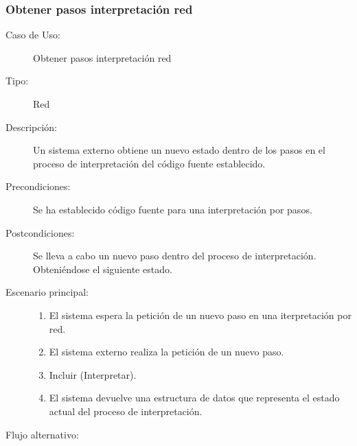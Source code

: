 \subsubsection{Obtener pasos interpretación red} 

\begin{description}
   \item[Caso de Uso:]  Obtener pasos interpretación red 
   \item [Tipo:] Red
   \item[Descripción:] 
   Un sistema externo obtiene un nuevo estado dentro de los pasos en el proceso de
   interpretación del código fuente establecido.
   \item[Precondiciones:] 
   Se ha establecido código fuente para una interpretación por pasos.
   \item[Postcondiciones:] 
   Se lleva a cabo un nuevo paso dentro del proceso de interpretación. Obteniéndose el 
   siguiente estado.
   \item[Escenario principal:] \hfill
   \begin{enumerate}
   \item El sistema espera la petición de un nuevo paso en una iterpretación por red.
   \item El sistema externo realiza la petición de un nuevo paso.
   \item Incluir (Interpretar).
   \item El sistema devuelve una estructura de datos que representa 
   el estado actual del proceso de interpretación.
   \end{enumerate}
   \item[Flujo alternativo:] \hfill 

\end{description}
